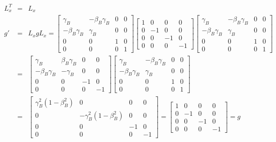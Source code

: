 \documentclass[11pt]{amsart}
\begin{document}
\begin{eqnarray*} 
L_{x}^{T} &=& L_{x} \\
g' &=& L_{x}gL_{x} = \begin{bmatrix}
	\gamma_{B} & -\beta_{B}\gamma_{B} & 0 & 0 \\
	-\beta_{B}\gamma_{B} & \gamma_{B} & 0 & 0 \\
	0 & 0 & 1 & 0 \\
	0 & 0 & 0 & 1 
	\end{bmatrix}\begin{bmatrix}
	1 & 0 & 0 & 0 \\
	0 & -1 & 0 & 0 \\
	0 & 0 & -1 & 0 \\
	0 & 0 & 0 & -1 
	\end{bmatrix}\begin{bmatrix}
	\gamma_{B} & -\beta_{B}\gamma_{B} & 0 & 0 \\
	-\beta_{B}\gamma_{B} & \gamma_{B} & 0 & 0 \\
	0 & 0 & 1 & 0 \\
	0 & 0 & 0 & 1 
	\end{bmatrix} \\
&=&  \begin{bmatrix}
	\gamma_{B} & \beta_{B}\gamma_{B} & 0 & 0 \\
	-\beta_{B}\gamma_{B} & -\gamma_{B} & 0 & 0 \\
	0 & 0 & -1 & 0 \\
	0 & 0 & 0 & -1 
	\end{bmatrix}\begin{bmatrix}
	\gamma_{B} & -\beta_{B}\gamma_{B} & 0 & 0 \\
	-\beta_{B}\gamma_{B} & \gamma_{B} & 0 & 0 \\
	0 & 0 & 1 & 0 \\
	0 & 0 & 0 & 1 
	\end{bmatrix} \\
&=& \begin{bmatrix}
	\gamma_{B}^{2}(1-\beta_{B}^{2}) & 0 & 0 & 0 \\
	0 & -\gamma_{B}^{2}(1-\beta_{B}^{2}) & 0 & 0 \\
	0 & 0 & -1 & 0 \\
	0 & 0 & 0 & -1 
	\end{bmatrix} = \begin{bmatrix}
	1 & 0 & 0 & 0 \\
	0 & -1 & 0 & 0 \\
	0 & 0 & -1 & 0 \\
	0 & 0 & 0 & -1
	\end{bmatrix} = g 
\end{eqnarray*} \\
\end{document}
